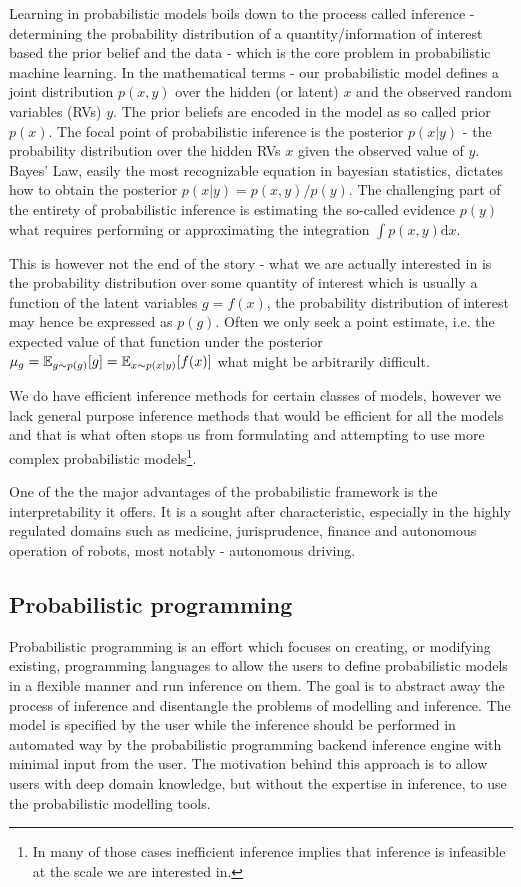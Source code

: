 \documentclass[12pt]{article}
\begin{document}
Learning in probabilistic models boils down to the process called inference - determining the probability distribution of a quantity/information of interest based the prior belief and the data - which is the core problem in probabilistic machine learning.
In the mathematical terms - our probabilistic model defines a joint distribution $p(x,y)$ over the hidden (or latent) $x$ and the observed random variables (RVs) $y$.
The prior beliefs are encoded in the model as so called prior $p(x)$.
The focal point of probabilistic inference is the posterior $p(x|y)$ - the probability distribution over the hidden RVs $x$ given the observed value of $y$.
Bayes' Law, easily the most recognizable equation in bayesian statistics, dictates how to obtain the posterior $p(x|y) = p(x,y)/p(y)$.
The challenging part of the entirety of probabilistic inference is estimating the so-called evidence $p(y)$ what requires performing or approximating the integration $\int p(x,y) \text{d}x$.

This is however not the end of the story - 
what we are actually interested in is the probability distribution over some quantity of interest which is usually a function of the latent variables $g=f(x)$, the probability distribution of interest may hence be expressed as $p(g)$.
Often we only seek a point estimate, i.e. the expected value of that function under the posterior $\mu_g=\mathbb{E}_{g \sim p(g)}[g]=\mathbb{E}_{x \sim p(x|y)}[f(x)]$ what might be arbitrarily difficult.

We do have efficient inference methods for certain classes of models, however we lack general purpose inference methods that would be efficient for all the models and that is what often stops us from formulating and attempting to use more complex probabilistic 
models\footnote{In many of those cases inefficient inference implies that inference is infeasible at the scale we are interested in.}.

One of the the major advantages of the probabilistic framework is the interpretability it offers.
It is a sought after characteristic, especially in the highly regulated domains such as medicine, jurisprudence, finance and autonomous operation of robots, most notably - autonomous driving.

\subsection{Probabilistic programming}
Probabilistic programming is an effort which focuses on creating, or modifying existing, programming languages to allow the users to define probabilistic models in a flexible manner and run inference on them.
The goal is to abstract away the process of inference and disentangle the problems of modelling and inference.
The model is specified by the user while the inference should be performed in automated way by the probabilistic programming backend inference engine with minimal input from the user.
The motivation behind this approach is to allow users with deep domain knowledge, but without the expertise in inference, to use the probabilistic modelling tools.
\end{document}
